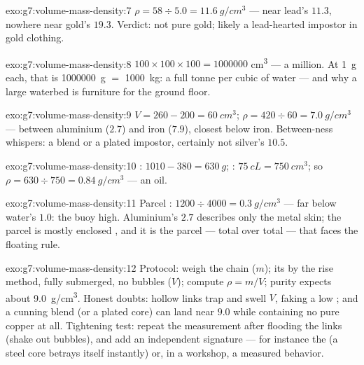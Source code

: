 \begin{solution}{exo:g7:volume-mass-density:7}
$\rho = 58 \div 5.0 = \qty{11.6}{g/cm^3}$ --- near lead's
$11.3$, nowhere near gold's $19.3$. Verdict: not pure gold;
likely a lead-hearted impostor in gold clothing.
\end{solution}

\begin{solution}{exo:g7:volume-mass-density:8}
$100 \times 100 \times 100 = 1000000$ \unit{cm^3} --- a million.
At \qty{1}{g} each, that is \qty{1000000}{g} $=$ \qty{1000}{kg}:
a full tonne per cubic  of water --- and why a large
waterbed is furniture for the ground floor.
\end{solution}

\begin{solution}{exo:g7:volume-mass-density:9}
$V = 260 - 200 = \qty{60}{cm^3}$;
$\rho = 420 \div 60 = \qty{7.0}{g/cm^3}$ --- between aluminium
($2.7$) and iron ($7.9$), closest below iron. Between-ness
whispers: a blend or a plated impostor, certainly not silver's
$10.5$.
\end{solution}

\begin{solution}{exo:g7:volume-mass-density:10}
 : $1010 - 380 = \qty{630}{g}$; :
$\qty{75}{cL} = \qty{750}{cm^3}$; so $\rho = 630 \div 750 =
\qty{0.84}{g/cm^3}$ --- an oil.
\end{solution}

\begin{solution}{exo:g7:volume-mass-density:11}
Parcel : $1200 \div 4000 = \qty{0.3}{g/cm^3}$ --- far
below water's $1.0$: the buoy  high. Aluminium's $2.7$
describes only the metal skin; the parcel is mostly enclosed ,
and it is the parcel --- total  over total  --- that
faces the floating rule.
\end{solution}

\begin{solution}{exo:g7:volume-mass-density:12}
Protocol: weigh the chain ($m$);  its  by the rise
method, fully submerged, no bubbles ($V$); compute $\rho = m/V$;
purity expects about \qty{9.0}{g/cm^3}. Honest doubts: hollow
links trap  and swell $V$, faking a low ; and a cunning
blend (or a plated core) can land near $9.0$ while containing no
pure copper at all. Tightening test: repeat the 
measurement after flooding the links (shake out bubbles), and add
an independent signature --- for instance the  (a steel
core betrays itself instantly) or, in a workshop, a measured
 behavior.
\end{solution}

